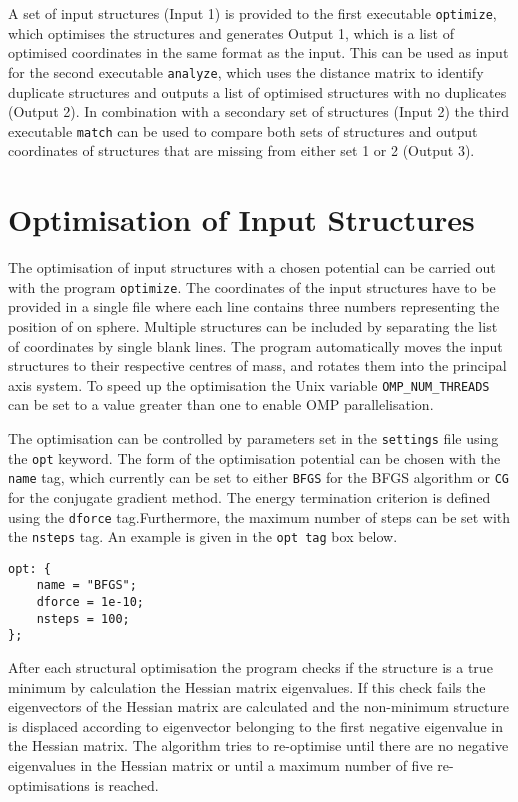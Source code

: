 %
A set of input structures (Input 1) is provided to the first executable
\texttt{optimize}, which optimises the structures and generates Output 1, which
is a list of optimised coordinates in the same format as the input. This can be
used as input for the second executable \texttt{analyze}, which uses the
distance matrix to identify duplicate structures and outputs a list of
optimised structures with no duplicates (Output 2). In combination with a
secondary set of structures (Input 2) the third executable \texttt{match} can
be used to compare both sets of structures and output coordinates of structures
that are missing from either set 1 or 2 (Output 3). 

\section{Optimisation of Input Structures}
\label{sec:optimisationofinputstructures}

The optimisation of input structures with a chosen potential can be carried out
with the program \texttt{optimize}. The coordinates of the input structures
have to be provided in a single file where each line contains three numbers
representing the position of on sphere. Multiple structures can be included by
separating the list of coordinates by single blank lines. The program
automatically moves the input structures to their respective centres of mass,
and rotates them into the principal axis system. To speed up the optimisation
the Unix variable \texttt{OMP\_NUM\_THREADS} can be set to a value
greater than one to enable \ac{OMP} parallelisation.

The optimisation can be controlled by parameters set in the \texttt{settings}
file using the \texttt{opt} keyword. The form of the optimisation potential can
be chosen with the \texttt{name} tag, which currently can be set to either
\texttt{BFGS} for the \ac{BFGS} algorithm or \texttt{CG} for the conjugate
gradient method. The energy termination criterion is defined using the
\texttt{dforce} tag.Furthermore, the maximum number of steps can be set with
the \texttt{nsteps} tag. An example is given in the \texttt{opt tag} box below.
%
\begin{Verbatim}[frame=lines,label=opt tag]
opt: {
    name = "BFGS";
    dforce = 1e-10;
    nsteps = 100;
};
\end{Verbatim}
%
After each structural optimisation the program checks if the structure is a
true minimum by calculation the Hessian matrix eigenvalues. If this check fails
the eigenvectors of the Hessian matrix are calculated and the non-minimum
structure is displaced according to eigenvector belonging to the first negative
eigenvalue in the Hessian matrix. The algorithm tries to re-optimise until
there are no negative eigenvalues in the Hessian matrix or until a maximum
number of five re-optimisations is reached.

